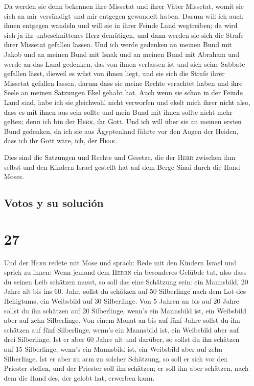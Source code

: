  Da werden sie denn bekennen ihre Missetat und ihrer
Väter Missetat, womit sie sich an mir versündigt und mir entgegen
gewandelt haben.  Darum will ich auch ihnen entgegen
wandeln und will sie in ihrer Feinde Land wegtreiben; da wird sich ja
ihr unbeschnittenes Herz demütigen, und dann werden sie sich die Strafe
ihrer Missetat gefallen lassen.  Und ich werde gedenken
an meinen Bund mit Jakob und an meinen Bund mit Isaak und an meinen Bund
mit Abraham und werde an das Land gedenken,  das von
ihnen verlassen ist und sich seine Sabbate gefallen lässt, dieweil es
wüst von ihnen liegt, und sie sich die Strafe ihrer Missetat gefallen
lassen, darum dass sie meine Rechte verachtet haben und ihre Seele an
meinen Satzungen Ekel gehabt hat.  Auch wenn sie schon in
der Feinde Land sind, habe ich sie gleichwohl nicht verworfen und ekelt
mich ihrer nicht also, dass es mit ihnen aus sein sollte und mein Bund
mit ihnen sollte nicht mehr gelten; denn ich bin der \textsc{Herr}, ihr
Gott.  Und ich will über sie an meinen ersten Bund
gedenken, da ich sie aus Ägyptenland führte vor den Augen der Heiden,
dass ich ihr Gott wäre, ich, der \textsc{Herr}.

 Dies sind die Satzungen und Rechte und Gesetze, die der
\textsc{Herr} zwischen ihm selbst und den Kindern Israel gestellt hat
auf dem Berge Sinai durch die Hand Moses.

\hypertarget{votos-y-su-soluciuxf3n}{%
\subsection{Votos y su solución}\label{votos-y-su-soluciuxf3n}}

\hypertarget{section-26}{%
\section{27}\label{section-26}}

 Und der \textsc{Herr} redete mit Mose und sprach:
 Rede mit den Kindern Israel und sprich zu ihnen: Wenn
jemand dem \textsc{Herrn} ein besonderes Gelübde tut, also dass du
seinen Leib schätzen musst,  so soll das eine Schätzung
sein: ein Mannsbild, 20 Jahre alt bis ins 60. Jahr, sollst du schätzen
auf 50 Silberlinge nach dem Lot des Heiligtums,  ein
Weibsbild auf 30 Silberlinge.  Von 5 Jahren an bis auf 20
Jahre sollst du ihn schätzen auf 20 Silberlinge, wenn's ein Mannsbild
ist, ein Weibsbild aber auf zehn Silberlinge.  Von einem
Monat an bis auf fünf Jahre sollst du ihn schätzen auf fünf Silberlinge,
wenn's ein Mannsbild ist, ein Weibsbild aber auf drei Silberlinge.
 Ist er aber 60 Jahre alt und darüber, so sollst du ihn
schätzen auf 15 Silberlinge, wenn's ein Mannsbild ist, ein Weibsbild
aber auf zehn Silberlinge.  Ist er aber zu arm zu solcher
Schätzung, so soll er sich vor den Priester stellen, und der Priester
soll ihn schätzen; er soll ihn aber schätzen, nach dem die Hand des, der
gelobt hat, erwerben kann.

